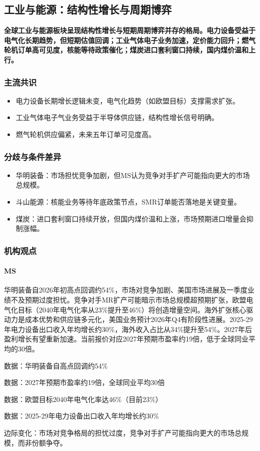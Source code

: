 \documentclass[11pt]{ctexart}
\begin{document}
\subsection{工业与能源：结构性增长与周期博弈}
\textbf{全球工业与能源板块呈现结构性增长与短期周期博弈并存的格局。电力设备受益于电气化长期趋势，但短期估值回调；工业气体电子业务加速，定价能力回升；燃气轮机订单高可见度，核能等待政策催化；煤炭进口套利窗口持续，国内煤价温和上行。}
\subsubsection*{主流共识}
\begin{itemize}
  \item 电力设备长期增长逻辑未变，电气化趋势（如欧盟目标）支撑需求扩张。
  \item 工业气体电子气业务受益于半导体供应链，结构性增长信号明确。
  \item 燃气轮机供应偏紧，未来五年订单可见度高。
\end{itemize}
\subsubsection*{分歧与条件差异}
\begin{itemize}
  \item 华明装备：市场担忧竞争加剧，但MS认为竞争对手扩产可能指向更大的市场总规模。
  \item 斗山能源：核能业务等待年底政策节点，SMR订单能否落地是关键变量。
  \item 煤炭：进口套利窗口持续开放，但国内煤价温和上涨，市场预期进口增量会抑制涨幅。
\end{itemize}
\subsubsection*{机构观点}
\paragraph{MS} 华明装备自2026年初高点回调约54\%，市场对竞争加剧、美国市场进展及一季度业绩不及预期过度担忧。竞争对手MR扩产可能暗示市场总规模超预期扩张，欧盟电气化目标（2040年电气化率从23\%提升至46\%）将创造增量空间。海外扩张核心驱动力是成本优势和供应链多元化，美国业务预计2026年Q4有阶段性进展。2025-29年电力设备出口收入年均增长约30\%，海外收入占比从34\%提升至54\%。2027年后盈利增长有望重新加速。当前报价对应2027年预期市盈率约19倍，低于全球同业平均的30倍。
{\small\color{refgray}数据：华明装备自高点回调约54\%\par}
{\small\color{refgray}数据：2027年预期市盈率约19倍，全球同业平均30倍\par}
{\small\color{refgray}数据：欧盟目标2040年电气化率达46\%（目前23\%）\par}
{\small\color{refgray}数据：2025-29年电力设备出口收入年均增长约30\%\par}
{\small\color{refgray}边际变化：市场对竞争格局的担忧过度，竞争对手扩产可能指向更大的市场总规模，而非份额争夺。\par}
\end{document}
